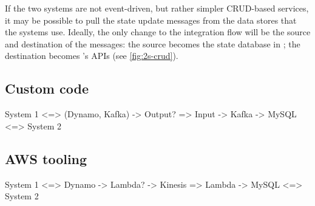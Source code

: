 If the two systems are not event-driven, but rather simpler CRUD-based services, it may be possible to pull the state update messages from the data stores that the systems use. Ideally, the only change to the integration flow will be the source and destination of the messages: the source becomes the state database in ; the destination becomes 's APIs (see \autoref{fig:2s-crud}).


\subsection{Custom code}
System 1 <=> (Dynamo, Kafka) -> Output? => Input -> Kafka -> MySQL <=> System 2

\subsection{AWS tooling}
System 1 <=> Dynamo -> Lambda? -> Kinesis => Lambda -> MySQL <=> System 2

